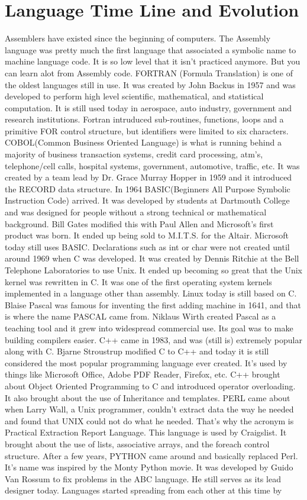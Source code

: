 \documentclass[letterpaper, 10 pt, conference]{IEEEtran}
\begin{document}
\section{Language Time Line and Evolution}
\indent Assemblers have existed since the beginning of computers. The Assembly language was pretty much the first language that associated a symbolic name to machine language code. It is so low level that it isn't practiced anymore. But you can learn alot from Assembly code.  FORTRAN (Formula Translation) is one of the oldest languages still in use. It was created by John Backus in 1957 and was developed to perform high level scientific, mathematical, and statistical computation. It is still used today in aerospace, auto industry, government and research institutions. Fortran intruduced sub-routines, functions, loops and a primitive FOR control structure, but identifiers were limited to six characters. COBOL(Common Business Oriented Language) is what is running behind a majority of business transaction systems, credit card processing, atm's, telephone/cell calls, hospital systems, government, automotive, traffic, etc. It was created by a team lead by Dr. Grace Murray Hopper in 1959 and it introduced the RECORD data structure. In 1964 BASIC(Beginners All Purpose Symbolic Instruction Code) arrived. It was developed by students at Dartmouth College and was designed for people without a strong technical or mathematical background. Bill Gates modified this with Paul Allen and Microsoft's first product was born. It ended up being sold to M.I.T.S. for the Altair. Microsoft today still uses BASIC. Declarations such as int or char were not created until around 1969 when C was developed. It was created by Dennis Ritchie at the Bell Telephone Laboratories to use Unix. It ended up becoming so great that the Unix kernel was rewritten in C. It was one of the first operating system kernels implemented in a language other than assembly. Linux today is still based on C. Blaise Pascal was famous for inventing the first adding machine in 1641, and that is where the name PASCAL came from. Niklaus Wirth created Pascal as a teaching tool and it grew into widespread commercial use. Its goal was to make building compilers easier. C++ came in 1983, and was (still is) extremely popular along with C. Bjarne Stroustrup modified C to C++ and today it is still considered the most popular programming language ever created. It's used by things like Microsoft Office, Adobe PDF Reader, Firefox, etc. C++ brought about Object Oriented Programming to C and introduced operator overloading. It also brought about the use of Inheritance and templates.  PERL came about when Larry Wall, a Unix programmer, couldn't extract data the way he needed and found that UNIX could not do what he needed. That's why the acronym is Practical Extraction Report Language. This language is used by Craigslist. It brought about the use of lists, associative arrays, and the foreach control structure. After a few years, PYTHON came around and basically replaced Perl. It's name was inspired by the Monty Python movie. It was developed by Guido Van Rossum to fix problems in the ABC language. He still serves as its lead designer today.  Languages started spreading from each other at this time by 
\end{document}

